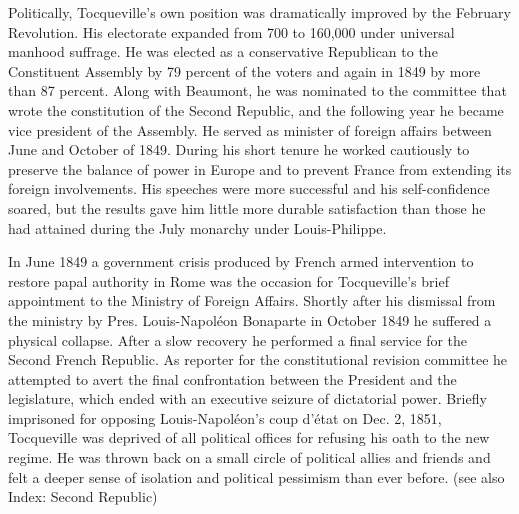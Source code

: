 \documentclass[12pt]{article}
\begin{document}
                                      Politically, Tocqueville's own position was dramatically improved by
                                      the February Revolution. His electorate expanded from 700 to 160,000
                                      under universal manhood suffrage. He was elected as a conservative
                                      Republican to the Constituent Assembly by 79 percent of the voters
                                      and again in 1849 by more than 87 percent. Along with Beaumont, he
                                      was nominated to the committee that wrote the constitution of the
                                      Second Republic, and the following year he became vice president of
                                      the Assembly. He served as minister of foreign affairs between June
                                      and October of 1849. During his short tenure he worked cautiously to
                                      preserve the balance of power in Europe and to prevent France from
                                      extending its foreign involvements. His speeches were more
                                      successful and his self-confidence soared, but the results gave him
                                      little more durable satisfaction than those he had attained during the
                                      July monarchy under Louis-Philippe. 




                                      In June 1849 a government crisis produced by French armed
                                      intervention to restore papal authority in Rome was the occasion for
                                      Tocqueville's brief appointment to the Ministry of Foreign Affairs.
                                      Shortly after his dismissal from the ministry by Pres. Louis-Napol\'{e}on
                                      Bonaparte in October 1849 he suffered a physical collapse. After a
                                      slow recovery he performed a final service for the Second French
                                      Republic. As reporter for the constitutional revision committee he
                                      attempted to avert the final confrontation between the President and
                                      the legislature, which ended with an executive seizure of dictatorial
                                      power. Briefly imprisoned for opposing Louis-Napol\'{e}on's coup d'\'{e}tat
                                      on Dec. 2, 1851, Tocqueville was deprived of all political offices for
                                      refusing his oath to the new regime. He was thrown back on a small
                                      circle of political allies and friends and felt a deeper sense of
                                      isolation and political pessimism than ever before. (see also Index:
                                      Second Republic) 
\end{document}
